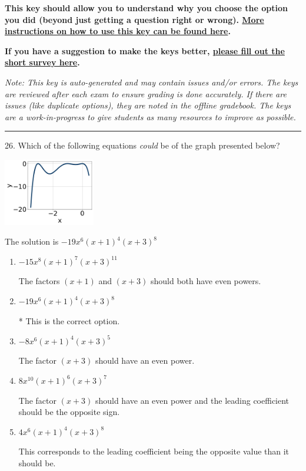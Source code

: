 \documentclass{extbook}[14pt]
\begin{document}
\textbf{This key should allow you to understand why you choose the option you did (beyond just getting a question right or wrong). \href{https://xronos.clas.ufl.edu/mac1105spring2020/courseDescriptionAndMisc/Exams/LearningFromResults}{More instructions on how to use this key can be found here}.}

\textbf{If you have a suggestion to make the keys better, \href{https://forms.gle/CZkbZmPbC9XALEE88}{please fill out the short survey here}.}

\textit{Note: This key is auto-generated and may contain issues and/or errors. The keys are reviewed after each exam to ensure grading is done accurately. If there are issues (like duplicate options), they are noted in the offline gradebook. The keys are a work-in-progress to give students as many resources to improve as possible.}

\rule{\textwidth}{0.4pt}

26. Which of the following equations \textit{could} be of the graph presented below?
\begin{center} \includegraphics[width=0.3\textwidth]{../Figures/polyGraphToFunctionB.png} \end{center} 

The solution is $ -19x^{6} (x + 1)^{4} (x + 3)^{8} $ 

\begin{enumerate}[label=\Alph*.] 
\item $ -15x^{8} (x + 1)^{7} (x + 3)^{11} $ 

 The factors $(x + 1)$ and $(x + 3)$ should both have even powers. 
\item $ -19x^{6} (x + 1)^{4} (x + 3)^{8} $ 

 * This is the correct option. 
\item $ -8x^{6} (x + 1)^{4} (x + 3)^{5} $ 

 The factor $(x + 3)$ should have an even power. 
\item $ 8x^{10} (x + 1)^{6} (x + 3)^{7} $ 

 The factor $(x + 3)$ should have an even power and the leading coefficient should be the opposite sign. 
\item $ 4x^{6} (x + 1)^{4} (x + 3)^{8} $ 

 This corresponds to the leading coefficient being the opposite value than it should be. 
\end{enumerate} 
 
\end{document}

